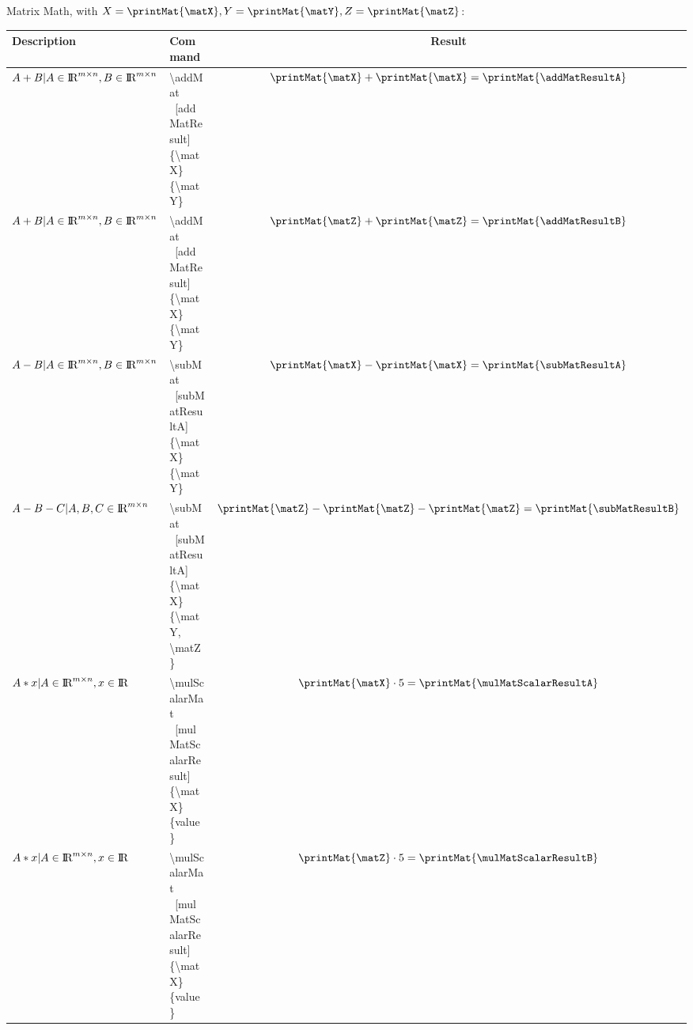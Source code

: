 \documentclass[10pt, a4paper]{article}
\begin{document}
Matrix Math, with \(X = \printMat{\matX}, Y = \printMat{\matY}, Z = \printMat{\matZ}\):

\mulMat[mulMatResultA]{\matX}{\matZ}
\mulMat[mulMatResultB]{\matY}{\matZ}
\mulMat[mulMatResultC]{\matZ}{\matY}
\addMat[addMatResultA]{\matX}{\matX}
\addMat[addMatResultB]{\matZ}{\matZ}
\subMat[subMatResultA]{\matX}{\matX}
\subMat[subMatResultB]{\matZ}{\matZ, \matZ}

\begin{center}
    \begin{tabular}{ l l c }
        Description & Command & Result\\ \hline
        \(A + B | A \in \textrm{I\!R}^{m\times n}, B \in \textrm{I\!R}^{m\times n}\) & \makecell[l]{\textbackslash addMat\\\ [addMatResult]\\\{\textbackslash matX\}\{\textbackslash matY\}} & \(\printMat{\matX} + \printMat{\matX} = \printMat{\addMatResultA}\)\\
        \(A + B | A \in \textrm{I\!R}^{m\times n}, B \in \textrm{I\!R}^{m\times n}\) & \makecell[l]{\textbackslash addMat\\\ [addMatResult]\\\{\textbackslash matX\}\{\textbackslash matY\}} & \(\printMat{\matZ} + \printMat{\matZ} = \printMat{\addMatResultB}\)\\
        \(A - B | A \in \textrm{I\!R}^{m\times n}, B \in \textrm{I\!R}^{m\times n}\) & \makecell[l]{\textbackslash subMat\\\ [subMatResultA]\\\{\textbackslash matX\}\{\textbackslash matY\}} & \(\printMat{\matX} - \printMat{\matX} = \printMat{\subMatResultA}\)\\
        \(A - B - C | A, B, C \in \textrm{I\!R}^{m\times n}\) & \makecell[l]{\textbackslash subMat\\\ [subMatResultA]\\\{\textbackslash matX\}\{\textbackslash matY, \textbackslash matZ\}} & \(\printMat{\matZ} - \printMat{\matZ} - \printMat{\matZ} = \printMat{\subMatResultB}\)\\
        \(A * x | A \in \textrm{I\!R}^{m\times n}, x \in \textrm{I\!R}\) & \makecell[l]{\textbackslash mulScalarMat\\\ [mulMatScalarResult]\\\{\textbackslash matX\}\{value\}} & \(\printMat{\matX} \cdot 5 = \printMat{\mulMatScalarResultA}\)\\
        \(A * x | A \in \textrm{I\!R}^{m\times n}, x \in \textrm{I\!R}\) & \makecell[l]{\textbackslash mulScalarMat\\\ [mulMatScalarResult]\\\{\textbackslash matX\}\{value\}} & \(\printMat{\matZ} \cdot 5 = \printMat{\mulMatScalarResultB}\)\\

\end{tabular}
\end{center}
\end{document}
